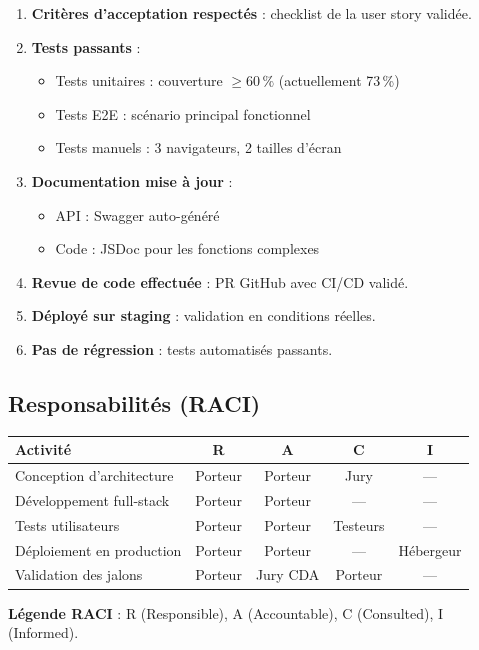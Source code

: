 \begin{enumerate}
  \item \textbf{Critères d'acceptation respectés} : checklist de la user story validée.
  \item \textbf{Tests passants} :
    \begin{itemize}
      \item Tests unitaires : couverture $\geq 60\,\%$ (actuellement 73\,\%)
      \item Tests E2E : scénario principal fonctionnel
      \item Tests manuels : 3 navigateurs, 2 tailles d'écran
    \end{itemize}
  \item \textbf{Documentation mise à jour} :
    \begin{itemize}
      \item API : Swagger auto-généré
      \item Code : JSDoc pour les fonctions complexes
    \end{itemize}
  \item \textbf{Revue de code effectuée} : PR GitHub avec CI/CD validé.
  \item \textbf{Déployé sur staging} : validation en conditions réelles.
  \item \textbf{Pas de régression} : tests automatisés passants.
\end{enumerate}

\subsection{Responsabilités (RACI)}

\begin{center}
\scriptsize
\begin{tabular}{|p{4.5cm}|c|c|c|c|}
\hline
\textbf{Activité} & \textbf{R} & \textbf{A} & \textbf{C} & \textbf{I} \\
\hline
Conception d'architecture & Porteur & Porteur & Jury & --- \\
\hline
Développement full-stack & Porteur & Porteur & --- & --- \\
\hline
Tests utilisateurs & Porteur & Porteur & Testeurs & --- \\
\hline
Déploiement en production & Porteur & Porteur & --- & Hébergeur \\
\hline
Validation des jalons & Porteur & Jury CDA & Porteur & --- \\
\hline
\end{tabular}
\end{center}

\textbf{Légende RACI} : R (Responsible), A (Accountable), C (Consulted), I (Informed).
